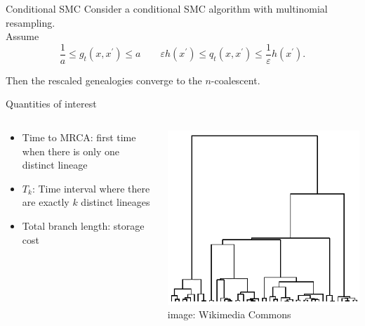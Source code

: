 \documentclass[aspectratio=169]{beamer}
\theoremstyle{definition}
\begin{document}
\begin{frame}{Conditional SMC}
Consider a conditional SMC algorithm with multinomial resampling.\\[10pt]
Assume
\begin{equation*}
\frac{1}{a} \leq g_t(x, x^\prime) \leq a \qquad
\varepsilon h(x^\prime) \leq q_t(x, x^\prime) \leq \frac{1}{\varepsilon} h(x^\prime) .
\end{equation*}

Then the rescaled genealogies converge to the $n$-coalescent.
\end{frame}


\begin{frame}{Quantities of interest}
\begin{columns}
\begin{column}{0.45\textwidth}
\begin{itemize}
\item Time to MRCA: first time when there is only one distinct lineage
\item $T_k$: Time interval where there are exactly $k$ distinct lineages
\item Total branch length: storage cost
\end{itemize}
\end{column}
\begin{column}{0.45\textwidth}
\includegraphics[width=\textwidth]{kingman.png}
\hspace*{\fill} \tiny{image: Wikimedia Commons}
\end{column}
\end{columns}
\end{frame}
\end{document}
